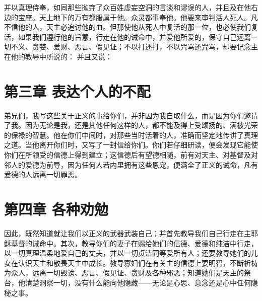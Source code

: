   并以真理侍奉，如同那些抛弃了众百姓虚妄空洞的言谈和谬误的人，并且及在他右边的宝座。天上地下的万有都服属于他。众灵都事奉他。他要来审判活人死人。凡不信他的人，天主必追讨他的血。但那使他从死人中复活的那一位，也必使我们复活，如果我们遵行他的旨意，行走在他的诫命中，并爱他所爱的，保守自己远离一切不义、贪婪、爱财、恶言、假见证；不以打还打，不以咒骂还咒骂，却要记念主在他的教导中所说的： 并且又说：\par


\section{第三章 表达个人的不配}

弟兄们，我写这些关于正义的事给你们，并非因为我自取什么，而是因为你们邀请了我。因为无论是我，还是其他任何这样的人，都不能及得上受颂扬的、满被光荣的保禄的智慧。他在你们中间时，对那些当时活着的人，准确而坚定地传讲了真理之道。当他离开你们时，又写了一封信给你们。你们若仔细研读，便会发现它能使你们在所领受的信德上得到建立；这信德后有望德相随，前有对天主、对基督及对邻人的爱德为前导，因为任何人若内里拥有这些恩宠，便满全了正义的诫命，凡有爱德的人远离一切罪恶。\par


\section{第四章 各种劝勉}

因此，既然知道就让我们以正义的武器武装自己；并首先教导我们自己行走在主耶稣基督的诫命中。其次，教导你们的妻子在赐给她们的信德、爱德和纯洁中行走，以一切真理温柔地爱自己的丈夫，并以一切贞洁同等爱所有人；还要教导她们的儿女在认识天主和敬畏天主中成长。教导寡妇们在有关主的信德上要明智，不断祈祷为众人，远离一切毁谤、恶言、假见证、贪财及各种邪恶；知道她们是天主的祭台，他清楚洞察一切，没有什么能向他隐藏——无论是心思、意念还是心中任何隐秘之事。\par


